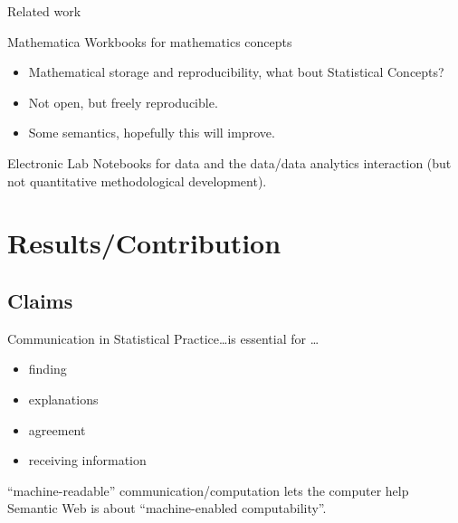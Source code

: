 \documentclass{beamer}
\begin{document}
\begin{frame}{Related work}

  Mathematica Workbooks for mathematics concepts
  \begin{itemize}
  \item Mathematical storage and reproducibility, what bout Statistical
    Concepts?
  \item Not open, but freely reproducible.
  \item Some semantics, hopefully this will improve.
  \end{itemize}

  Electronic Lab Notebooks for data and the data/data analytics
  interaction (but not quantitative methodological development).
\end{frame}

\section{Results/Contribution}

\subsection{Claims}


\begin{frame}{Communication in Statistical Practice}{\ldots is essential for \ldots}
  \begin{itemize}
  \item finding
  \item explanations
  \item agreement
  \item receiving information
  \end{itemize}
  \alert{``machine-readable'' communication/computation lets the
    computer help} \\
  Semantic Web is about ``machine-enabled computability''.
\end{frame}
\end{document}
